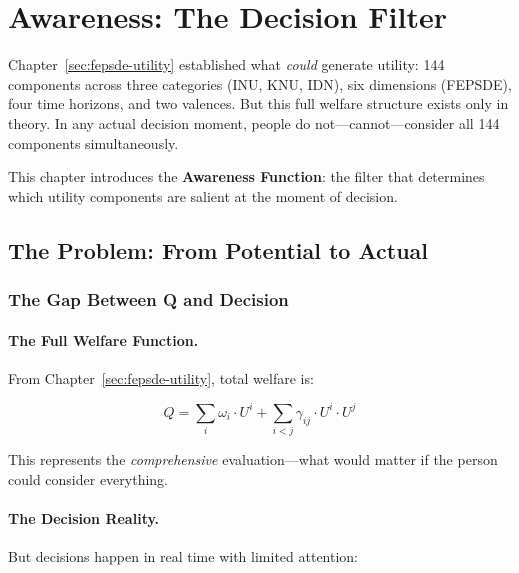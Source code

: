 \section{Awareness: The Decision Filter}
\label{sec:awareness}


Chapter~\ref{sec:fepsde-utility} established what \emph{could} generate utility:
144 components across three categories (INU, KNU, IDN), six dimensions (FEPSDE),
four time horizons, and two valences. But this full welfare structure exists
only in theory. In any actual decision moment, people do not---cannot---consider
all 144 components simultaneously.

This chapter introduces the \textbf{Awareness Function}: the filter that determines
which utility components are salient at the moment of decision.

\subsection{The Problem: From Potential to Actual}
\label{subsec:awareness-problem}

\subsubsection{The Gap Between Q and Decision}

\paragraph{The Full Welfare Function.}
From Chapter~\ref{sec:fepsde-utility}, total welfare is:

\begin{equation}
Q = \sum_{i} \omega_i \cdot U^i + \sum_{i<j} \gamma_{ij} \cdot U^i \cdot U^j
\end{equation}

This represents the \emph{comprehensive} evaluation---what would matter if
the person could consider everything.

\paragraph{The Decision Reality.}
But decisions happen in real time with limited attention:

